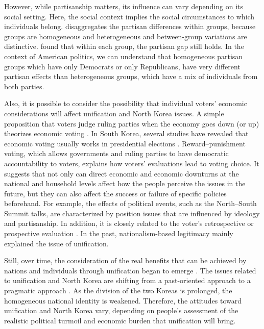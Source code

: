 \documentclass[letterpaper,9pt,twocolumn,twoside,]{pinp}
\begin{document}
However, while partisanship matters, its influence can vary depending on
its social setting. Here, the social context implies the social
circumstances to which individuals belong. \citet{Klar2014}
disaggregates the partisan differences within groups, because groups are
homogeneous and heterogeneous and between-group variations are
distinctive. \citet{Klar2014} found that within each group, the partisan
gap still holds. In the context of American politics, we can understand
that homogeneous partisan groups which have only Democrats or only
Republicans, have very different partisan effects than heterogeneous
groups, which have a mix of individuals from both parties.

Also, it is possible to consider the possibility that individual voters'
economic considerations will affect unification and North Korea issues.
A simple proposition that voters judge ruling parties when the economy
goes down (or up) theorizes economic voting
\citep{Fiorina1981, Abramowitz2008}. In South Korea, several studies
have revealed that economic voting usually works in presidential
elections \citep{Lee2008, Jang2013, Moon2018}. Reward--punishment
voting, which allows governments and ruling parties to have democratic
accountability to voters, explains how voters' evaluations lead to
voting choice. It suggests that not only can direct economic and
economic downturns at the national and household levels affect how the
people perceive the issues in the future, but they can also affect the
success or failure of specific policies beforehand. For example, the
effects of political events, such as the North--South Summit talks, are
characterized by position issues that are influenced by ideology and
partisanship. In addition, it is closely related to the voter's
retrospective or prospective evaluation \citep{Kim2007}. In the past,
nationalism-based legitimacy mainly explained the issue of unification.

Still, over time, the consideration of the real benefits that can be
achieved by nations and individuals through unification began to emerge
\citep{Choi2016}. The issues related to unification and North Korea are
shifting from a past-oriented approach to a pragmatic approach
\citep{ChoHan2014}. As the division of the two Koreas is prolonged, the
homogeneous national identity is weakened. Therefore, the attitudes
toward unification and North Korea vary, depending on people's
assessment of the realistic political turmoil and economic burden that
unification will bring.
\end{document}
